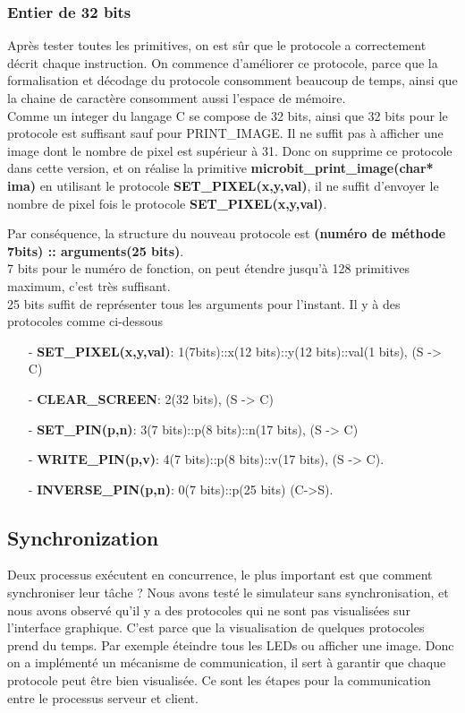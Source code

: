 \documentclass[14px]{article}
\begin{document}
	\subsubsection{Entier de 32 bits}
	Après tester toutes les primitives, on est sûr que le protocole a correctement décrit chaque instruction. On commence d'améliorer ce protocole, parce que la formalisation et décodage du protocole consomment beaucoup de temps, ainsi que la chaine de caractère consomment aussi l'espace de mémoire.\\
	Comme un integer du langage C se compose de 32 bits, ainsi que 32 bits pour le protocole est suffisant sauf pour PRINT\_IMAGE. Il ne suffit pas à afficher une image dont le nombre de pixel est supérieur à 31. Donc on supprime ce protocole dans cette version, et on réalise la primitive \textbf{microbit\_print\_image(char* ima)} en utilisant le protocole \textbf{SET\_PIXEL(x,y,val)}, il ne suffit d'envoyer le nombre de pixel fois le protocole \textbf{SET\_PIXEL(x,y,val)}.
	
	Par conséquence, la structure du nouveau protocole est \textbf{(numéro de méthode 7bits) :: arguments(25 bits)}.\\
	7 bits pour le numéro de fonction, on peut étendre jusqu'à 128 primitives maximum, c'est très suffisant. \\ 25 bits suffit de représenter tous les arguments pour l'instant.
	Il y à des protocoles comme ci-dessous
	\begin{enumerate}
		\item[-] \textbf{SET\_PIXEL(x,y,val)}: 1(7bits)::x(12 bits)::y(12 bits)::val(1 bits), (S -> C)
		\item[-] \textbf{CLEAR\_SCREEN}: 2(32 bits), (S -> C)
		\item[-] \textbf{SET\_PIN(p,n)}: 3(7 bits)::p(8 bits)::n(17 bits), (S -> C)
		\item[-] \textbf{WRITE\_PIN(p,v)}: 4(7 bits)::p(8 bits)::v(17 bits), (S -> C).\\
		
		\item[-] \textbf{INVERSE\_PIN(p,n)}: 0(7 bits)::p(25 bits) (C->S).
	\end{enumerate}
	
	
	\subsection{Synchronization}
	Deux processus exécutent en concurrence, le plus important est que comment synchroniser leur tâche ? Nous avons testé le simulateur sans synchronisation, et nous avons observé qu'il y a des protocoles qui ne sont pas visualisées sur l'interface graphique. C'est parce que la visualisation de quelques protocoles prend du temps. Par exemple éteindre tous les LEDs ou afficher une image. Donc on a implémenté un mécanisme de communication, il sert à garantir que chaque protocole peut être bien visualisée. Ce sont les étapes pour la communication entre le processus serveur et client.
	
\end{document}
